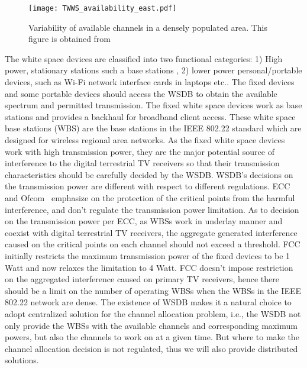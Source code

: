 \documentclass[times]{ettauth}
\newcommand{\ie}{i.e., }
\theoremstyle{mytheoremstyle}
\theoremstyle{mytheoremstyle}
\theoremstyle{mytheoremstyle}
\begin{document}
\begin{figure}[h!]
  \centering
  \texttt{[image: TWWS\_availability\_east.pdf]}
  \caption{Variability of available channels in a densely populated area. This figure is obtained from \cite{googleDatabase}}
\label{variability_TVWS}
\end{figure}

The white space devices are classified into two functional categories: 1) High power, stationary stations such a base stations , 2) lower power personal/portable devices, such as Wi-Fi network interface cards in laptops etc..
The fixed devices and some portable devices should access the WSDB to obtain the available spectrum and permitted transmission.
%
The fixed white space devices work as base stations and provides a backhaul for broadband client access.
These white space base stations (WBS) are the base stations in the IEEE 802.22 standard which are designed for wireless regional area networks.
As the fixed white space devices work with high transmission power, they are the major potential source of interference to the digital terrestrial TV receivers so that their transmission characteristics should be carefully decided by the WSDB.
WSDB's decisions on the transmission power are different with respect to different regulations.
ECC and Ofcom~\cite{ECC186, ECMA392} emphasize on the protection of the critical points from the harmful interference, and don't regulate the transmission power limitation. 
As to decision on the transmission power per ECC, as WBSs work in underlay manner and coexist with digital terrestrial TV receivers, the aggregate generated interference caused on the critical points on each channel should not exceed a threshold.
FCC initially restricts the maximum transmission power of the fixed devices to be 1 Watt and now relaxes the limitation to 4 Watt.
FCC doesn't impose restriction on the aggregated interference caused on primary TV receivers, hence there should be a limit on the number of operating WBSs when the WBSs in the IEEE 802.22 network are dense.
%
The existence of WSDB makes it a natural choice to adopt centralized solution for the channel allocation problem, \ie the WSDB not only provide the WBSs with the available channels and corresponding maximum powers, but also the channels to work on at a given time.
But where to make the channel allocation decision is not regulated, thus we will also provide distributed solutions.
\end{document}
